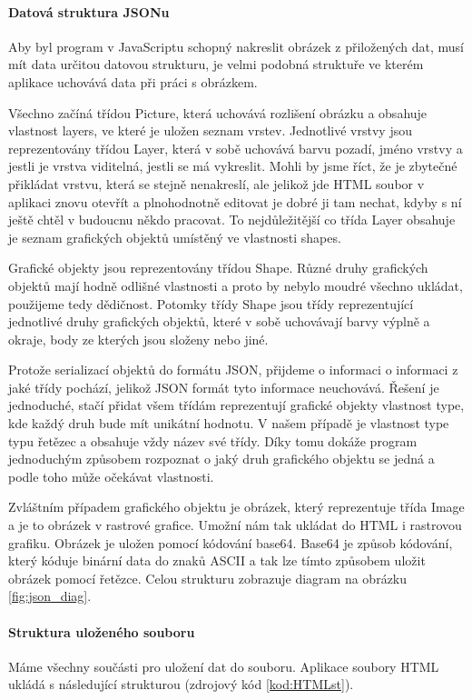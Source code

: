\documentclass[
  field=inf,
  biblatex,
  glossaries,
  index
]{kidiplom}
\begin{document}
\paragraph{Datová struktura JSONu}
Aby byl program v JavaScriptu schopný nakreslit obrázek z přiložených dat, musí mít data určitou datovou strukturu, je velmi podobná struktuře ve kterém aplikace uchovává data při práci s obrázkem.

Všechno začíná třídou Picture, která uchovává rozlišení obrázku a obsahuje vlastnost layers, ve které je uložen seznam vrstev. Jednotlivé vrstvy jsou reprezentovány třídou Layer, která v sobě uchovává barvu pozadí, jméno vrstvy a jestli je vrstva viditelná, jestli se má vykreslit. Mohli by jsme říct, že je zbytečné přikládat vrstvu, která se stejně nenakreslí, ale jelikož jde HTML soubor v aplikaci znovu otevřít a plnohodnotně editovat je dobré ji tam nechat, kdyby s ní ještě chtěl v budoucnu někdo pracovat. To nejdůležitější co třída Layer obsahuje je seznam grafických objektů  umístěný ve vlastnosti shapes.

Grafické objekty jsou reprezentovány třídou Shape. Různé druhy grafických objektů mají hodně odlišné vlastnosti a proto by nebylo moudré všechno ukládat, použijeme tedy dědičnost. Potomky třídy Shape jsou třídy reprezentující jednotlivé druhy grafických objektů, které v sobě uchovávají barvy výplně a okraje, body ze kterých jsou složeny nebo jiné.

Protože serializací objektů do formátu JSON, přijdeme o informaci o informaci z jaké třídy pochází, jelikož JSON formát tyto informace neuchovává. Řešení je jednoduché, stačí přidat všem třídám reprezentují grafické objekty vlastnost type, kde každý druh bude mít unikátní hodnotu. V našem případě je vlastnost type typu řetězec a obsahuje vždy název své třídy. Díky tomu dokáže program jednoduchým způsobem rozpoznat o jaký druh grafického objektu se jedná a podle toho může očekávat vlastnosti.

Zvláštním případem grafického objektu je obrázek, který reprezentuje třída Image a je to obrázek v rastrové grafice. Umožní nám tak ukládat do HTML i rastrovou grafiku. Obrázek je uložen pomocí kódování base64. Base64 je způsob kódování, který kóduje binární data do znaků ASCII a tak lze tímto způsobem uložit obrázek pomocí řetězce. Celou strukturu zobrazuje diagram na obrázku \ref{fig:json_diag}.

\paragraph{Struktura uloženého souboru}
Máme všechny součásti pro uložení dat do souboru. Aplikace soubory HTML ukládá s následující strukturou (zdrojový kód \ref{kod:HTMLst}).
\end{document}
